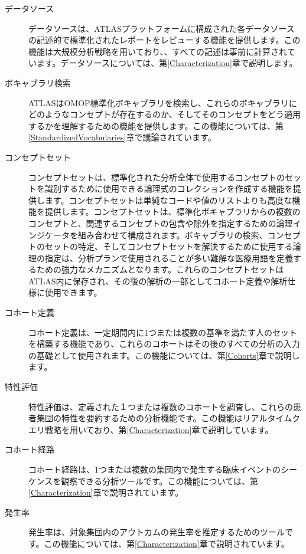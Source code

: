 \documentclass[
  11pt]{book}
\theoremstyle{definition}
\theoremstyle{definition}
\theoremstyle{definition}
\theoremstyle{definition}
\theoremstyle{remark}
\begin{document}
\begin{description}
\item[データソース  ]
データソースは、ATLASプラットフォームに構成された各データソースの記述的で標準化されたレポートをレビューする機能を提供します。この機能は大規模分析戦略を用いており、、すべての記述は事前に計算されています。データソースについては、第\ref{Characterization}章で説明します。
\item[ボキャブラリ検索 ]
ATLASはOMOP標準化ボキャブラリを検索し、これらのボキャブラリにどのようなコンセプトが存在するのか、そしてそのコンセプトをどう適用するかを理解するための機能を提供します。この機能については、第\ref{StandardizedVocabularies}章で議論されています。
\item[コンセプトセット ]
コンセプトセットは、標準化された分析全体で使用するコンセプトのセットを識別するために使用できる論理式のコレクションを作成する機能を提供します。コンセプトセットは単純なコードや値のリストよりも高度な機能を提供します。コンセプトセットは、標準化ボキャブラリからの複数のコンセプトと、関連するコンセプトの包含や除外を指定するための論理インジケータを組み合わせて構成されます。ボキャブラリの検索、コンセプトのセットの特定、そしてコンセプトセットを解決するために使用する論理の指定は、分析プランで使用されることが多い難解な医療用語を定義するための強力なメカニズムとなります。これらのコンセプトセットはATLAS内に保存され、その後の解析の一部としてコホート定義や解析仕様に使用できます。
\item[コホート定義 ]
コホート定義は、一定期間内に1つまたは複数の基準を満たす人のセットを構築する機能であり、これらのコホートはその後のすべての分析の入力の基礎として使用されます。この機能については、第\ref{Cohorts}章で説明します。
\item[特性評価]
特性評価は、定義された１つまたは複数のコホートを調査し、これらの患者集団の特性を要約するための分析機能です。この機能はリアルタイムクエリ戦略を用いており、第\ref{Characterization}章で説明しています。
\item[コホート経路 ]
コホート経路は、1つまたは複数の集団内で発生する臨床イベントのシーケンスを観察できる分析ツールです。この機能については、第\ref{Characterization}章で説明されています。
\item[発生率 ]
発生率は、対象集団内のアウトカムの発生率を推定するためのツールです。この機能については、第\ref{Characterization}章で説明されています。

\end{description}
\end{document}
